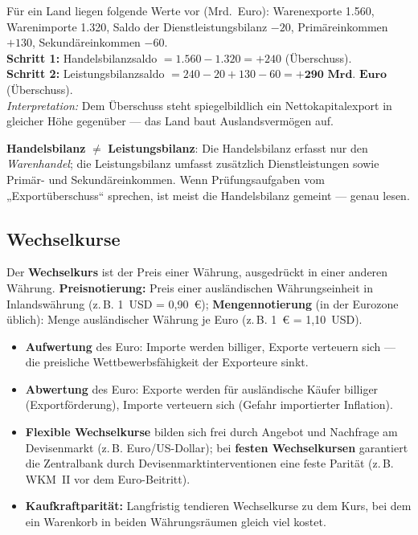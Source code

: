 \documentclass[11pt, a4paper]{article}
\begin{document}
\begin{beispiel}
Für ein Land liegen folgende Werte vor (Mrd.~Euro): Warenexporte 1.560, Warenimporte
1.320, Saldo der Dienstleistungsbilanz $-20$, Primäreinkommen $+130$, Sekundäreinkommen
$-60$.\\[0.3em]
\textbf{Schritt 1:} Handelsbilanzsaldo $= 1.560 - 1.320 = +240$ (Überschuss).\\
\textbf{Schritt 2:} Leistungsbilanzsaldo $= 240 - 20 + 130 - 60 =
\textbf{+290~Mrd.~Euro}$ (Überschuss).\\[0.3em]
\emph{Interpretation:} Dem Überschuss steht spiegelbildlich ein Nettokapitalexport in
gleicher Höhe gegenüber --- das Land baut Auslandsvermögen auf.
\end{beispiel}

\begin{achtung}
\textbf{Handelsbilanz} $\neq$ \textbf{Leistungsbilanz}: Die Handelsbilanz erfasst nur den
\emph{Warenhandel}; die Leistungsbilanz umfasst zusätzlich Dienstleistungen sowie Primär-
und Sekundäreinkommen. Wenn Prüfungsaufgaben vom „Exportüberschuss`` sprechen, ist meist
die Handelsbilanz gemeint --- genau lesen.
\end{achtung}

\subsection{Wechselkurse}

Der \textbf{Wechselkurs} ist der Preis einer Währung, ausgedrückt in einer anderen
Währung. \textbf{Preisnotierung:} Preis einer ausländischen Währungseinheit in Inlandswährung
(z.\,B. 1~USD = 0,90~€); \textbf{Mengennotierung} (in der Eurozone üblich): Menge
ausländischer Währung je Euro (z.\,B. 1~€ = 1,10~USD).

\begin{itemize}
  \item \textbf{Aufwertung} des Euro: Importe werden billiger, Exporte verteuern sich ---
    die preisliche Wettbewerbsfähigkeit der Exporteure sinkt.
  \item \textbf{Abwertung} des Euro: Exporte werden für ausländische Käufer billiger
    (Exportförderung), Importe verteuern sich (Gefahr importierter Inflation).
  \item \textbf{Flexible Wechselkurse} bilden sich frei durch Angebot und Nachfrage am
    Devisenmarkt (z.\,B. Euro/US-Dollar); bei \textbf{festen Wechselkursen} garantiert
    die Zentralbank durch Devisenmarktinterventionen eine feste Parität (z.\,B. WKM~II
    vor dem Euro-Beitritt).
  \item \textbf{Kaufkraftparität:} Langfristig tendieren Wechselkurse zu dem Kurs, bei
    dem ein Warenkorb in beiden Währungsräumen gleich viel kostet.
\end{itemize}
\end{document}
